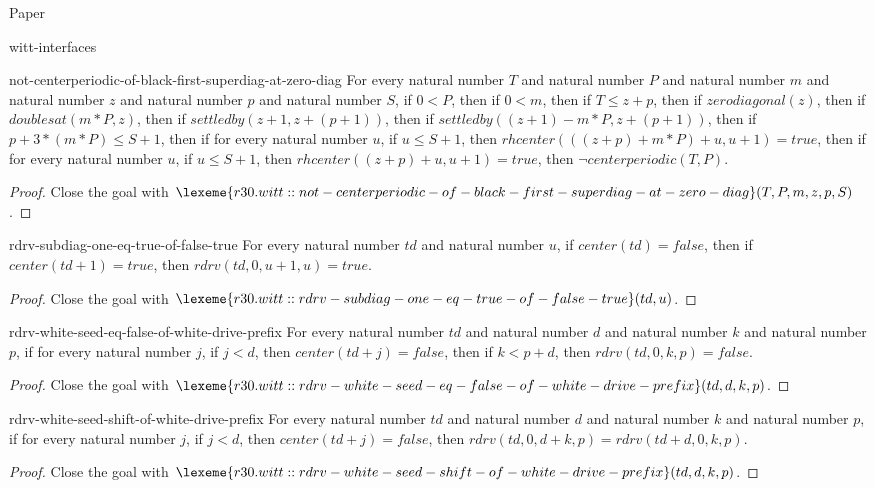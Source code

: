 \begin{lexlean}{Paper}
\begin{section}{witt-interfaces}
  \begin{theorem}{not-centerperiodic-of-black-first-superdiag-at-zero-diag}
  For every natural number \(T\) and natural number \(P\) and natural number \(m\) and natural number \(z\) and natural number \(p\) and natural number \(S\), if \(0 < P\), then if \(0 < m\), then if \(T ≤ z + p\), then if \(zerodiagonal(z)\), then if \(doublesat(m * P, z)\), then if \(settledby(z + 1, z + (p + 1))\), then if \(settledby((z + 1) - m * P, z + (p + 1))\), then if \(p + 3 * (m * P) ≤ S + 1\), then if for every natural number \(u\), if \(u ≤ S + 1\), then \(rhcenter(((z + p) + m * P) + u, u + 1) = true\), then if for every natural number \(u\), if \(u ≤ S + 1\), then \(rhcenter((z + p) + u, u + 1) = true\), then \(¬ centerperiodic(T, P)\).
  \begin{proof}
  Close the goal with \(\lexeme{r30.witt::not-centerperiodic-of-black-first-superdiag-at-zero-diag}(T, P, m, z, p, S)\).
  \end{proof}
  \end{theorem}

  \begin{theorem}{rdrv-subdiag-one-eq-true-of-false-true}
  For every natural number \(td\) and natural number \(u\), if \(center(td) = false\), then if \(center(td + 1) = true\), then \(rdrv(td, 0, u + 1, u) = true\).
  \begin{proof}
  Close the goal with \(\lexeme{r30.witt::rdrv-subdiag-one-eq-true-of-false-true}(td, u)\).
  \end{proof}
  \end{theorem}

  \begin{theorem}{rdrv-white-seed-eq-false-of-white-drive-prefix}
  For every natural number \(td\) and natural number \(d\) and natural number \(k\) and natural number \(p\), if for every natural number \(j\), if \(j < d\), then \(center(td + j) = false\), then if \(k < p + d\), then \(rdrv(td, 0, k, p) = false\).
  \begin{proof}
  Close the goal with \(\lexeme{r30.witt::rdrv-white-seed-eq-false-of-white-drive-prefix}(td, d, k, p)\).
  \end{proof}
  \end{theorem}

  \begin{theorem}{rdrv-white-seed-shift-of-white-drive-prefix}
  For every natural number \(td\) and natural number \(d\) and natural number \(k\) and natural number \(p\), if for every natural number \(j\), if \(j < d\), then \(center(td + j) = false\), then \(rdrv(td, 0, d + k, p) = rdrv(td + d, 0, k, p)\).
  \begin{proof}
  Close the goal with \(\lexeme{r30.witt::rdrv-white-seed-shift-of-white-drive-prefix}(td, d, k, p)\).
  \end{proof}
  \end{theorem}


\end{section}
\end{lexlean}
